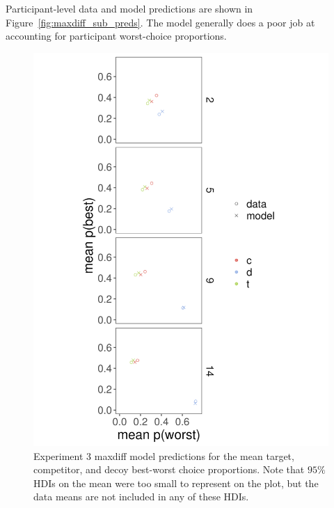 Participant-level data and model predictions are shown in Figure~\ref{fig:maxdiff_sub_preds}. The model generally does a poor job at accounting for participant worst-choice proportions.
\begin{figure}
   \includegraphics[width=\linewidth]{figures/maxdiff_1_means_model_v_data.jpeg}
   \caption{Experiment 3 maxdiff model predictions for the mean target, competitor, and decoy best-worst choice proportions. Note that $95\%$ HDIs on the mean were too small to represent on the plot, but the data means are not included in any of these HDIs.}
   \label{fig:maxdiff_collapsed_preds}
\end{figure}


